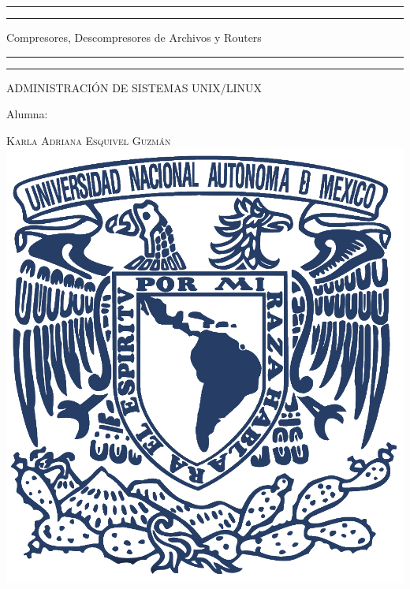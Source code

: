 \documentclass[a4paper, 11pt, oneside]{article}
\begin{document}
 

\begin{titlepage} 

	\centering 
	
	\scshape 
	
	\vspace*{\baselineskip} 
	
	
	
	\rule{\textwidth}{1.6pt}\vspace*{-\baselineskip}\vspace*{2pt} 
	\rule{\textwidth}{0.4pt} 
	
	\vspace{0.75\baselineskip} 
	
	{\LARGE Compresores, Descompresores de Archivos y Routers}	
	\vspace{0.75\baselineskip} 
	
	\rule{\textwidth}{0.4pt}\vspace*{-\baselineskip}\vspace{3.2pt}
	\rule{\textwidth}{1.6pt} 
	
	\vspace{2\baselineskip} 
	

	ADMINISTRACIÓN DE SISTEMAS UNIX/LINUX
	
	\vspace*{3\baselineskip} 
	
	
	
	Alumna:
	
	\vspace{0.5\baselineskip} 
	
	{\scshape\Large Karla Adriana Esquivel Guzmán \\} 
	\vspace{0.5\baselineskip} 
	\vfill
	\includegraphics{unam.jpg}
	

\end{titlepage}
\end{document}
